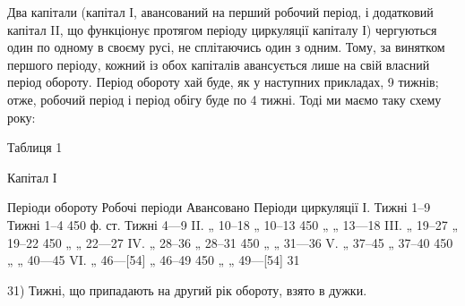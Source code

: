 Два капітали (капітал І, авансований на перший робочий період, і додатковий
капітал II, що функціонує протягом періоду циркуляції капіталу І)
чергуються один по одному в своєму русі, не сплітаючись один з одним.
Тому, за винятком першого періоду, кожний із обох капіталів авансується
лише на свій власний період обороту. Період обороту хай буде,
як у наступних прикладах, 9 тижнів; отже, робочий період і період обігу
буде по 4 тижні. Тоді ми маємо таку схему року:

Таблиця 1

Капітал І

Періоди обороту    Робочі періоди    Авансовано    Періоди циркуляції
І. Тижні 1--9    Тижні 1--4                 450 ф. ст.        Тижні 4—9
II.    „   10--18        „      10--13             450 „ „                  13—18
III.   „   19--27       „       19--22             450 „ „                22—27
IV.   „    28--36      „        28--31             450 „ „               31—36
V.     „    37--45      „        37--40             450 „ „               40—45
VI.   „    46—[54]  „        46--49            450 „ „            49—[54] 31

31) Тижні, що припадають на другий рік обороту, взято в дужки.
